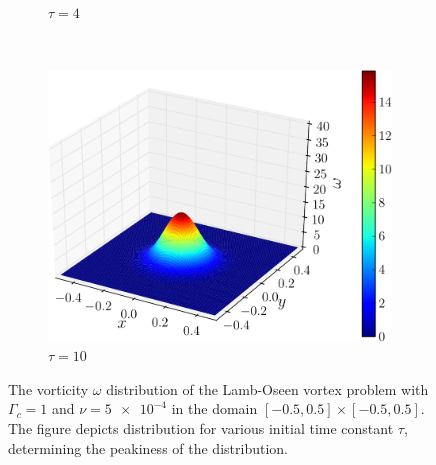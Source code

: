 \begin{figure}[!t]
\begin{subfigure}[b]{0.3\textwidth}
                \caption{$\tau = 4$}
                \label{fig:lambOseen_tau4}
        \end{subfigure}
		~
        \begin{subfigure}[b]{0.3\textwidth}
                \includegraphics[width=\textwidth]{figures/lagrangian/lambOseen_definition_tau=10-crop.pdf}
                \caption{$\tau = 10$}
                \label{fig:lambOseen_tau10}
        \end{subfigure}        
        
        \caption{The vorticity $\omega$ distribution of the Lamb-Oseen vortex problem with $\Gamma_c = 1$ and $\nu=\num{5e-4}$ in the domain $[-0.5,0.5]\times[-0.5,0.5]$. The figure depicts distribution for various initial time constant $\tau$, determining the peakiness of the distribution.}
        \label{fig:lambOseen_distributions}
	\end{figure}
	
